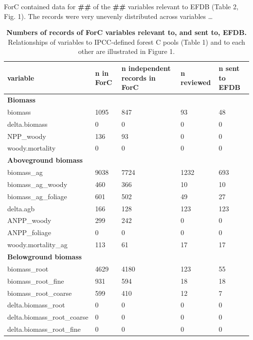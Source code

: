 \documentclass[, manuscript]{copernicus}
\begin{document}
ForC contained data for \textbf{\#\#} of the \textbf{\#\#} variables
relevant to EFDB (Table 2, Fig. 1). The records were very unevenly
distributed across variables \ldots{}

\begin{longtabu} to 
\caption{\label{tab:table_variables}\textbf{Numbers of records of ForC variables relevant to, and sent to, EFDB.} Relationships of variables to IPCC-defined forest C pools (Table 1) and to each other are illustrated in Figure 1. }\\
\hline
\textbf{variable} & \textbf{n in ForC} & \textbf{n independent records in ForC} & \textbf{n reviewed} & \textbf{n sent to EFDB}\\
\hline
\textbf{Biomass} & \textbf{} & \textbf{} & \textbf{} & \textbf{}\\
\hline
biomass & 1095 & 847 & 93 & 48\\
\hline
delta.biomass & 0 & 0 & 0 & 0\\
\hline
NPP\_woody & 136 & 93 & 0 & 0\\
\hline
woody.mortality & 0 & 0 & 0 & 0\\
\hline
\textbf{Aboveground biomass} & \textbf{} & \textbf{} & \textbf{} & \textbf{}\\
\hline
biomass\_ag & 9038 & 7724 & 1232 & 693\\
\hline
biomass\_ag\_woody & 460 & 366 & 10 & 10\\
\hline
biomass\_ag\_foliage & 601 & 502 & 49 & 27\\
\hline
delta.agb & 166 & 128 & 123 & 123\\
\hline
ANPP\_woody & 299 & 242 & 0 & 0\\
\hline
ANPP\_foliage & 0 & 0 & 0 & 0\\
\hline
woody.mortality\_ag & 113 & 61 & 17 & 17\\
\hline
\textbf{Belowground biomass} & \textbf{} & \textbf{} & \textbf{} & \textbf{}\\
\hline
biomass\_root & 4629 & 4180 & 123 & 55\\
\hline
biomass\_root\_fine & 931 & 594 & 18 & 18\\
\hline
biomass\_root\_coarse & 599 & 410 & 12 & 7\\
\hline
delta.biomass\_root & 0 & 0 & 0 & 0\\
\hline
delta.biomass\_root\_coarse & 0 & 0 & 0 & 0\\
\hline
delta.biomass\_root\_fine & 0 & 0 & 0 & 0\\

\end{longtabu}
\end{document}

